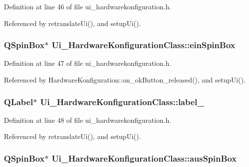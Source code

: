 Definition at line 46 of file ui\_\-hardwarekonfiguration.h.

Referenced by retranslateUi(), and setupUi().\hypertarget{class_ui___hardware_konfiguration_class_bb2d6d985395acde0ae066f61c1f39d2}{
\subsubsection[einSpinBox]{\setlength{\rightskip}{0pt plus 5cm}QSpinBox$\ast$ {\bf Ui\_\-HardwareKonfigurationClass::einSpinBox}}}
\label{class_ui___hardware_konfiguration_class_bb2d6d985395acde0ae066f61c1f39d2}




Definition at line 47 of file ui\_\-hardwarekonfiguration.h.

Referenced by HardwareKonfiguration::on\_\-okButton\_\-released(), and setupUi().\hypertarget{class_ui___hardware_konfiguration_class_ebe435becf558ce72d262af64d933ce6}{
\subsubsection[label\_\-4]{\setlength{\rightskip}{0pt plus 5cm}QLabel$\ast$ {\bf Ui\_\-HardwareKonfigurationClass::label\_}}}
\label{class_ui___hardware_konfiguration_class_ebe435becf558ce72d262af64d933ce6}




Definition at line 48 of file ui\_\-hardwarekonfiguration.h.

Referenced by retranslateUi(), and setupUi().\hypertarget{class_ui___hardware_konfiguration_class_b6e494df3044deb527985ebd16e99b70}{
\subsubsection[ausSpinBox]{\setlength{\rightskip}{0pt plus 5cm}QSpinBox$\ast$ {\bf Ui\_\-HardwareKonfigurationClass::ausSpinBox}}}
\label{class_ui___hardware_konfiguration_class_b6e494df3044deb527985ebd16e99b70}




